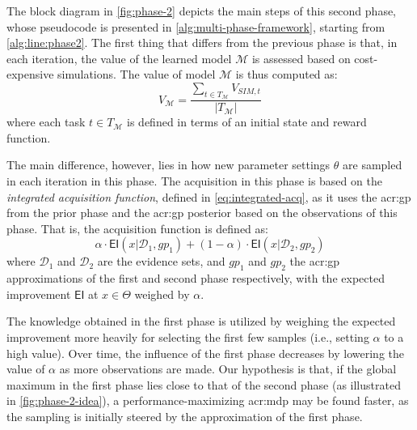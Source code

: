 The block diagram in \autoref{fig:phase-2} depicts the main steps of this second phase, whose pseudocode is presented in \autoref{alg:multi-phase-framework}, starting from \autoref{alg:line:phase2}.
The first thing that differs from the previous phase is that, in each iteration, the value of the learned model $\mathcal{M}$ is assessed based on cost-expensive simulations.
The value of model $\mathcal{M}$ is thus computed as:
\begin{equation*}
V_\mathcal{M} = \frac{\sum_{t \in T_\mathcal{M}} V_{\mathit{SIM}, t}}{|T_\mathcal{M}|}
\end{equation*}
\noindent where each task $t \in T_\mathcal{M}$ is defined in terms of an initial state and reward function.

The main difference, however, lies in how new parameter settings $\theta$ are sampled in each iteration in this phase.
The acquisition in this phase is based on the \textit{integrated acquisition function}, defined in \autoref{eq:integrated-acq}, as it uses the \acrshort{acr:gp} from the prior phase and the \acrshort{acr:gp} posterior based on the observations of this phase.
That is, the acquisition function is defined as:
$$\alpha\cdot\mathsf{EI}(x\vert\mathcal{D}_1, \mathit{gp}_1) + (1 - \alpha)\cdot\mathsf{EI}(x\vert\mathcal{D}_2, \mathit{gp}_2)$$
\noindent where $\mathcal{D}_1$ and $\mathcal{D}_2$ are the evidence sets, and $\mathit{gp}_1$ and $\mathit{gp}_2$ the \acrshort{acr:gp} approximations of the first and second phase respectively, with the expected improvement $\mathsf{EI}$ at $x \in \Theta$ weighed by $\alpha$.

The knowledge obtained in the first phase is utilized by weighing the expected improvement more heavily for selecting the first few samples (i.e., setting $\alpha$ to a high value).
Over time, the influence of the first phase decreases by lowering the value of $\alpha$ as more observations are made.
Our hypothesis is that, if the global maximum in the first phase lies close to that of the second phase (as illustrated in \autoref{fig:phase-2-idea}), a performance-maximizing \acrshort{acr:mdp} may be found faster, as the sampling is initially steered by the approximation of the first phase.




